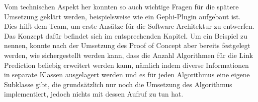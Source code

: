 Vom technischen Aspekt her konnten so auch wichtige Fragen für die spätere Umsetzung geklärt werden, beispielsweise
wie ein Gephi-Plugin aufgebaut ist. Dies hilft dem Team, um erste Ansätze für die Software Architektur zu entwerfen.
Das Konzept dafür befindet sich im entsprechenden Kapitel. Um ein Beispiel zu nennen, konnte nach der Umsetzung des
Proof of Concept aber bereits festgelegt werden, wie sichergestellt werden kann, dass die Anzahl Algorithmen für die
Link Prediction beliebig erweitert werden kann, nämlich indem diverse Informationen in separate Klassen ausgelagert
werden und es für jeden Algorithmus eine eigene Subklasse gibt, die grundsätzlich nur noch die Umsetzung des Algorithmus
implementiert, jedoch nichts mit dessen Aufruf zu tun hat.
